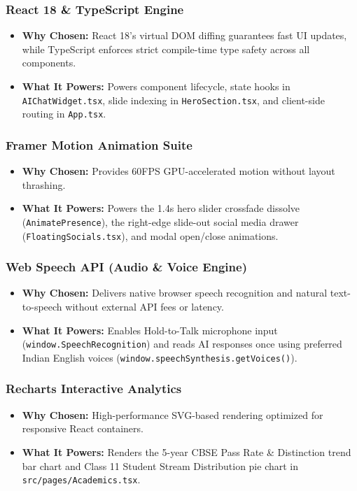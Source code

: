 \documentclass[11pt,a4paper]{article}
\begin{document}
\subsubsection{React 18 \& TypeScript Engine}
\begin{itemize}
    \item \textbf{Why Chosen:} React 18's virtual DOM diffing guarantees fast UI updates, while TypeScript enforces strict compile-time type safety across all components.
    \item \textbf{What It Powers:} Powers component lifecycle, state hooks in \texttt{AIChatWidget.tsx}, slide indexing in \texttt{HeroSection.tsx}, and client-side routing in \texttt{App.tsx}.
\end{itemize}

\subsubsection{Framer Motion Animation Suite}
\begin{itemize}
    \item \textbf{Why Chosen:} Provides 60FPS GPU-accelerated motion without layout thrashing.
    \item \textbf{What It Powers:} Powers the 1.4s hero slider crossfade dissolve (\texttt{AnimatePresence}), the right-edge slide-out social media drawer (\texttt{FloatingSocials.tsx}), and modal open/close animations.
\end{itemize}

\subsubsection{Web Speech API (Audio \& Voice Engine)}
\begin{itemize}
    \item \textbf{Why Chosen:} Delivers native browser speech recognition and natural text-to-speech without external API fees or latency.
    \item \textbf{What It Powers:} Enables Hold-to-Talk microphone input (\texttt{window.SpeechRecognition}) and reads AI responses once using preferred Indian English voices (\texttt{window.speechSynthesis.getVoices()}).
\end{itemize}

\subsubsection{Recharts Interactive Analytics}
\begin{itemize}
    \item \textbf{Why Chosen:} High-performance SVG-based rendering optimized for responsive React containers.
    \item \textbf{What It Powers:} Renders the 5-year CBSE Pass Rate \& Distinction trend bar chart and Class 11 Student Stream Distribution pie chart in \texttt{src/pages/Academics.tsx}.
\end{itemize}
\end{document}
